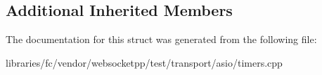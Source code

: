 \subsection*{Additional Inherited Members}


The documentation for this struct was generated from the following file\+:\begin{DoxyCompactItemize}
\item 
libraries/fc/vendor/websocketpp/test/transport/asio/timers.\+cpp\end{DoxyCompactItemize}
